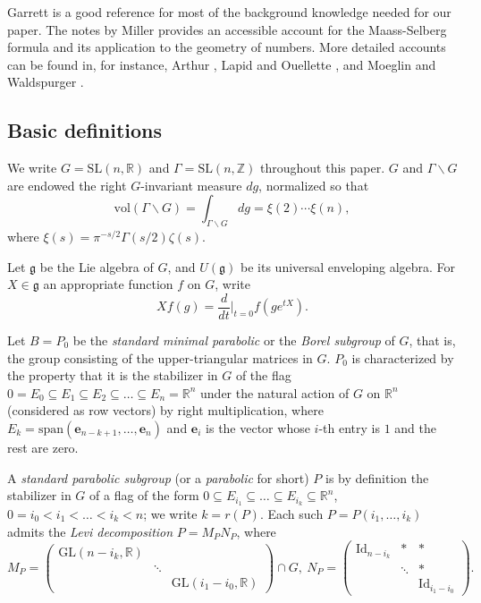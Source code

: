 \documentclass[11pt]{amsart}
\def\R{\mathbb{R}}
\numberwithin{theorem}{section}
\numberwithin{equation}{section}
\theoremstyle{remark}
\theoremstyle{definition}
\newcommand{\Z}{\mathbb{Z}}
\newcommand{\spn}{\mathrm{span}}
\newcommand{\GL}{\mathrm{GL}}
\newcommand{\SL}{\mathrm{SL}}
\newcommand{\Lg}{\mathfrak{g}}
\newcommand{\Id}{\mathrm{Id}}
\newcommand{\ve}{\mathbf{e}}
\begin{document}
Garrett \cite{Gar18} is a good reference for most of the background knowledge needed for our paper. The notes by Miller \cite{Mil20} provides an accessible account for the Maass-Selberg formula and its application to the geometry of numbers.
More detailed accounts can be found in, for instance, Arthur \cite{Art05}, Lapid and Ouellette \cite{LO12}, and Moeglin and Waldspurger \cite{MW95}.



\subsection{Basic definitions}

We write $G = \SL(n,\R)$ and $\Gamma = \SL(n,\Z)$ throughout this paper. $G$ and $\Gamma \backslash G$ are endowed the right $G$-invariant measure $dg$, normalized so that
\begin{equation*}
\mathrm{vol}(\Gamma \backslash G) = \int_{\Gamma \backslash G} dg = \xi(2) \cdots \xi(n),
\end{equation*}
where $\xi(s) = \pi^{-s/2}\Gamma(s/2)\zeta(s)$.

Let $\Lg$ be the Lie algebra of $G$, and $U(\Lg)$ be its universal enveloping algebra. For $X \in \Lg$ an appropriate function $f$ on $G$, write
\begin{equation*}
Xf(g) = \frac{d}{dt}\bigg\rvert_{t=0} f(ge^{tX}).
\end{equation*}

Let $B=P_0$ be the \emph{standard minimal parabolic} or the \emph{Borel subgroup} of $G$, that is, the group consisting of the upper-triangular matrices in $G$. $P_0$ is characterized by the property that it is the stabilizer in $G$ of the flag $0 = E_0 \subseteq E_1 \subseteq E_2 \subseteq \ldots \subseteq E_n = \R^n$ under the natural action of $G$ on $\R^n$ (considered as row vectors) by right multiplication, where $E_k = \spn(\ve_{n-k+1},\ldots,\ve_n)$ and $\ve_i$ is the vector whose $i$-th entry is $1$ and the rest are zero.

A \emph{standard parabolic subgroup} (or a \emph{parabolic} for short) $P$ is by definition the stabilizer in $G$ of a flag of the form $0 \subseteq E_{i_1} \subseteq \ldots \subseteq E_{i_k} \subseteq \R^n$, $0 = i_0 < i_1 < \ldots < i_k < n$; we write $k = r(P)$. Each such $P=P(i_1,\dots, i_k)$ admits the \emph{Levi decomposition} $P = M_PN_P$, where
\begin{equation*}
M_{P} =
\begin{pmatrix}
\GL(n-i_k,\R) &  &  \\
  & \ddots &  \\
  &  & \GL(i_1-i_0,\R) \end{pmatrix} \cap G,\ 
N_{P} = \begin{pmatrix}
\Id_{n-i_k} & * & * \\
  & \ddots & * \\
  & & \Id_{i_1-i_0} \end{pmatrix}.
\end{equation*}
\end{document}
